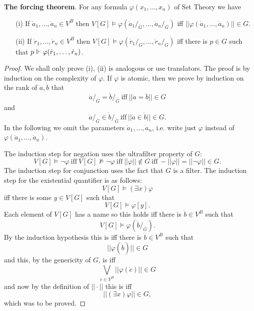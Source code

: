 \begin{theorem}{\bf The forcing theorem}\label{forcingTHM}. For any formula $\varphi(x_1,\ldots,x_n)$ of Set Theory we have
 \begin{itemize}
  \item[(i)] If $\dot{a}_1,\ldots,\dot{a}_n\in V^B$ then $V[G]\models \varphi(\dot{a}_1/_{\bar{G}},\ldots,\dot{a}_n/_{\bar{G}})$ iff
             $||\varphi(\dot{a}_1,\ldots,\dot{a}_n)||\in G$.
  \item[(ii)] If $\dot{r}_1,\ldots,\dot{r}_n\in V^B$ then $V[G]\models \varphi(\dot{r}_1/_{G},\ldots,\dot{r}_n/_{G})$ iff
             there is $p\in G$ such that $p\Vdash\varphi(\dot{r}_1,\ldots,\dot{r}_n)$.
 \end{itemize}
\end{theorem}
\begin{proof} We shall only prove (i), (ii) is analogous or use translators. The proof is by induction on the complexity of $\varphi$. If $\varphi$ is
 atomic, then we prove by induction on the rank of $\dot{a},\dot{b}$ that
 $$
 \dot{a}/_{\bar{G}}=\dot{b}/_{\bar{G}}\ \mbox{iff}\ ||\dot{a}=\dot{b}||\in G
 $$
 and
 $$
 \dot{a}/_{\bar{G}}\in\dot{b}/_{\bar{G}}\ \mbox{iff}\ ||\dot{a}\in\dot{b}||\in G.
 $$
 In the following we omit the parameters $\dot{a}_1,\ldots,\dot{a}_n$, i.e. write just $\varphi$ instead of $\varphi(\dot{a}_1,\ldots,\dot{a}_n)$.

 The induction step for negation uses the ultrafilter property of $G$:
 $$
 V[G]\models \neg\varphi\ \mbox{iff}\ V[G]\not\models \neg\varphi\ \mbox{iff}\ ||\varphi||\not\in G\ \mbox{iff}\ -||\varphi|| = ||\neg\varphi|| \in G.
 $$
 The induction step for conjunction uses the fact that $G$ is a filter. The induction step
 for the existential quantifier is as follows:
 $$
 V[G]\models(\exists x)\varphi
 $$
 iff there is some $y\in V[G]$ such that
 $$
 V[G]\models\varphi[y].
 $$
 Each element of $V[G]$ has a name so this holds iff there is $\dot{b}\in V^B$ such that
 $$
 V[G]\models\varphi(\dot{b}/_{\bar{G}}).
 $$
 By the induction hypothesis this is iff there is $\dot{b}\in V^B$ such that
 $$
 ||\varphi(\dot{b})||\in G
 $$
 and this, by the genericity of $G$, is iff
 $$
 \bigvee_{\dot{c}\in V^B} ||\varphi(\dot{c})||\in G
 $$
 and now by the definition of $||\cdot||$ this is iff
 $$
 ||(\exists x)\varphi||\in G,
 $$
 which was to be proved.
\end{proof}

